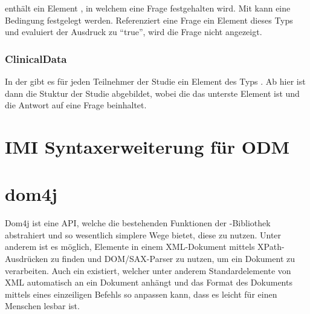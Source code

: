 enthält ein Element , in welchem eine Frage festgehalten wird.
Mit  kann eine Bedingung festgelegt werden.
Referenziert eine Frage ein Element dieses Typs und evaluiert der Ausdruck zu \enquote{true}, wird die Frage nicht angezeigt.

\subsubsection{ClinicalData}

In der  gibt es für jeden Teilnehmer der Studie ein Element des Typs .
Ab hier ist dann die Stuktur der Studie abgebildet, wobei die  das unterste Element ist und die Antwort auf eine Frage beinhaltet.

\section{IMI Syntaxerweiterung für ODM}

\section{dom4j}


Dom4j ist eine API, welche die bestehenden Funktionen der -Bibliothek abstrahiert und so wesentlich simplere Wege bietet, diese zu nutzen.
Unter anderem ist es möglich, Elemente in einem XML-Dokument mittels XPath-Ausdrücken zu finden und DOM/SAX-Parser zu nutzen, um ein Dokument zu verarbeiten.
Auch ein  existiert, welcher unter anderem Standardelemente von XML automatisch an ein Dokument anhängt und das Format des Dokuments mittels eines einzeiligen Befehls so anpassen kann, dass es leicht für einen Menschen lesbar ist.




